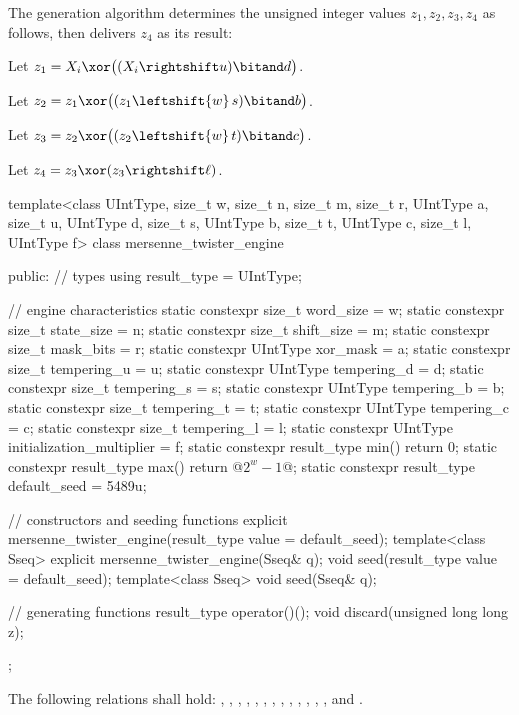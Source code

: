 \pnum
The generation algorithm%
%
 determines the unsigned integer values $z_1, z_2, z_3, z_4$ as follows,
 then delivers $z_4$ as its result:
\begin{enumeratea}
 \item
   Let $z_1 = X_i \xor \bigl(( X_i \rightshift u ) \bitand d\bigr)$.
 \item
   Let $z_2 = z_1 \xor \bigl( (z_1 \leftshift{w} \, s) \bitand b \bigr)$.
 \item
   Let $z_3 = z_2 \xor \bigl( (z_2 \leftshift{w} \, t) \bitand c \bigr)$.
 \item
   Let $z_4 = z_3 \xor ( z_3 \rightshift \ell )$.
\end{enumeratea}

%
\begin{codeblock}
template<class UIntType, size_t w, size_t n, size_t m, size_t r,
          UIntType a, size_t u, UIntType d, size_t s,
          UIntType b, size_t t,
          UIntType c, size_t l, UIntType f>
 class mersenne_twister_engine
{
public:
 // types
 using result_type = UIntType;

 // engine characteristics
 static constexpr size_t word_size = w;
 static constexpr size_t state_size = n;
 static constexpr size_t shift_size = m;
 static constexpr size_t mask_bits = r;
 static constexpr UIntType xor_mask = a;
 static constexpr size_t tempering_u = u;
 static constexpr UIntType tempering_d = d;
 static constexpr size_t tempering_s = s;
 static constexpr UIntType tempering_b = b;
 static constexpr size_t tempering_t = t;
 static constexpr UIntType tempering_c = c;
 static constexpr size_t tempering_l = l;
 static constexpr UIntType initialization_multiplier = f;
 static constexpr result_type min() { return 0; }
 static constexpr result_type max() { return  @$2^w - 1$@; }
 static constexpr result_type default_seed = 5489u;

 // constructors and seeding functions
 explicit mersenne_twister_engine(result_type value = default_seed);
 template<class Sseq> explicit mersenne_twister_engine(Sseq& q);
 void seed(result_type value = default_seed);
 template<class Sseq> void seed(Sseq& q);

 // generating functions
 result_type operator()();
 void discard(unsigned long long z);
};
\end{codeblock}

\pnum
The following relations shall hold:
  ,
  ,
  ,
  ,
  ,
  ,
  ,
  ,
  ,
  ,
  ,
  ,
  ,
and
  .

